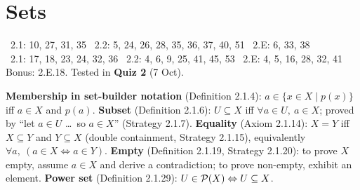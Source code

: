 \chapter{Sets}
%
{\fE\ 2.1: 10, 27, 31, 35 \textperiodcentered\ 2.2: 5, 24, 26, 28, 35, 36, 37, 40, 51 \textperiodcentered\ 2.E: 6, 33, 38\\ \fR\ 2.1: 17, 18, 23, 24, 32, 36 \textperiodcentered\ 2.2: 4, 6, 9, 25, 41, 45, 53 \textperiodcentered\ 2.E: 4, 5, 16, 28, 32, 41\\ Bonus: 2.E.18. Tested in \textbf{Quiz 2} (7 Oct).}


\begin{key}
\textbf{Membership in set-builder notation} (Definition 2.1.4): $a\in\{x\in X\mid p(x)\}$ iff $a\in X$ and $p(a)$. \textbf{Subset} (Definition 2.1.6): $U\subseteq X$ iff $\forall a\in U,\ a\in X$; proved by ``let $a\in U$ \dots\ so $a\in X$'' (Strategy 2.1.7). \textbf{Equality} (Axiom 2.1.14): $X=Y$ iff $X\subseteq Y$ and $Y\subseteq X$ (double containment, Strategy 2.1.15), equivalently $\forall a,\ (a\in X\Leftrightarrow a\in Y)$. \textbf{Empty} (Definition 2.1.19, Strategy 2.1.20): to prove $X$ empty, assume $a\in X$ and derive a contradiction; to prove non-empty, exhibit an element. \textbf{Power set} (Definition 2.1.29): $U\in\mathcal{P}(X)\Leftrightarrow U\subseteq X$.
\end{key}

